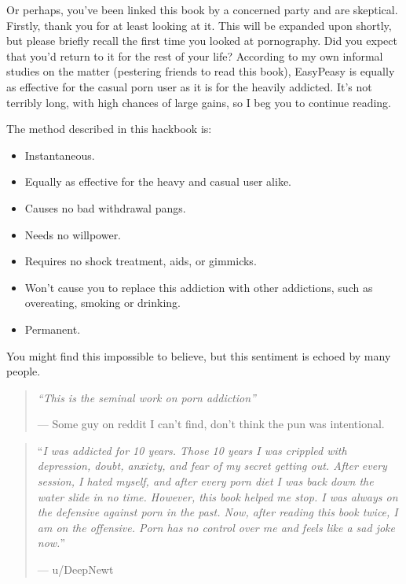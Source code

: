 \documentclass[
]{book}
\begin{document}
Or perhaps, you've been linked this book by a concerned party and are skeptical. Firstly, thank you for at least looking at it. This will be expanded upon shortly, but please briefly recall the first time you looked at pornography. Did you expect that you'd return to it for the rest of your life? According to my own informal studies on the matter (pestering friends to read this book), EasyPeasy is equally as effective for the casual porn user as it is for the heavily addicted. It's not terribly long, with high chances of large gains, so I beg you to continue reading.

The method described in this hackbook is:

\begin{itemize}
\item
  Instantaneous.
\item
  Equally as effective for the heavy and casual user alike.
\item
  Causes no bad withdrawal pangs.
\item
  Needs no willpower.
\item
  Requires no shock treatment, aids, or gimmicks.
\item
  Won't cause you to replace this addiction with other addictions, such as overeating, smoking or drinking.
\item
  Permanent.
\end{itemize}

You might find this impossible to believe, but this sentiment is echoed by many people.

\begin{quote}
\emph{``This is the seminal work on porn addiction''}

--- Some guy on reddit I can't find, don't think the pun was intentional.
\end{quote}

\begin{quote}
``\emph{I was addicted for 10 years. Those 10 years I was crippled with depression, doubt, anxiety, and fear of my secret getting out. After every session, I hated myself, and after every porn diet I was back down the water slide in no time. However, this book helped me stop. I was always on the defensive against porn in the past. Now, after reading this book twice, I am on the offensive. Porn has no control over me and feels like a sad joke now.}''

--- u/DeepNewt
\end{quote}
\end{document}
